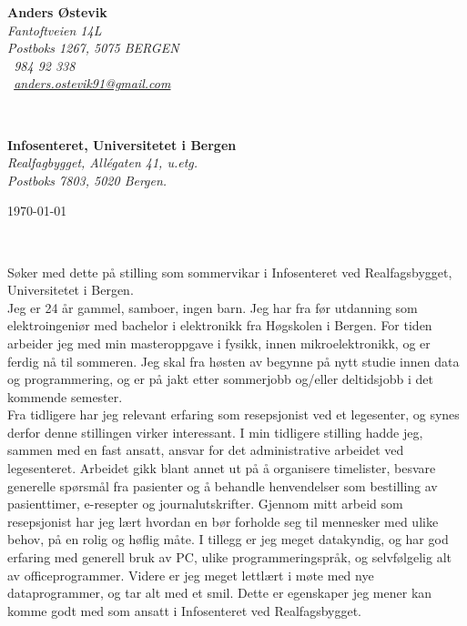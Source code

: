 \documentclass[11pt, norsk]{article}
\begin{document}
\sffamily   %
\hfill%
\begin{minipage}[t]{.6\textwidth}
\raggedleft%
{\bfseries Anders Østevik}\\[.35ex]
\small\itshape%
Fantoftveien 14L\\
Postboks 1267, 5075 BERGEN\\[.35ex]
\Telefon~984 92 338\\
\Letter~\href{mailto:anders.ostevik91@gmail.com}{anders.ostevik91@gmail.com}
\end{minipage}\\[1em]
%
\begin{minipage}[t]{.4\textwidth}
\raggedright%
{\bfseries Infosenteret, Universitetet i Bergen}\\[.35ex]
\small\itshape%
Realfagbygget, Allégaten 41, u.etg.\\
Postboks 7803, 5020 Bergen.
\end{minipage}
\hfill %
\begin{minipage}[t]{.4\textwidth}
\raggedleft %
\today
\end{minipage}\\[2em]
\raggedright

%
Søker med dette på stilling som sommervikar i Infosenteret ved Realfagsbygget, Universitetet i Bergen.\\[1.5em]
Jeg er 24 år gammel, samboer, ingen barn. Jeg har fra før utdanning som elektroingeniør med bachelor i elektronikk fra Høgskolen i Bergen. For tiden arbeider jeg med min masteroppgave i fysikk, innen mikroelektronikk, og er ferdig nå til sommeren. Jeg skal fra høsten av begynne på nytt studie innen data og programmering, og er på jakt etter sommerjobb og/eller deltidsjobb i det kommende semester.\\[1.0em]

Fra tidligere har jeg relevant erfaring som resepsjonist ved et legesenter, og synes derfor denne stillingen virker interessant. I min tidligere stilling hadde jeg, sammen med en fast ansatt, ansvar for det administrative arbeidet ved legesenteret. Arbeidet gikk blant annet ut på å organisere timelister, besvare generelle spørsmål fra pasienter og å behandle henvendelser som bestilling av pasienttimer, e-resepter og journalutskrifter. Gjennom mitt arbeid som resepsjonist har jeg lært hvordan en bør forholde seg til mennesker med ulike behov, på en rolig og høflig måte. I tillegg er jeg meget datakyndig, og har god erfaring med generell bruk av PC, ulike programmeringspråk, og selvfølgelig alt av officeprogrammer. Videre er jeg meget lettlært i møte med nye dataprogrammer, og tar alt med et smil. Dette er egenskaper jeg mener kan komme godt med som ansatt i Infosenteret ved Realfagsbygget. \\[1.5em]
\end{document}
